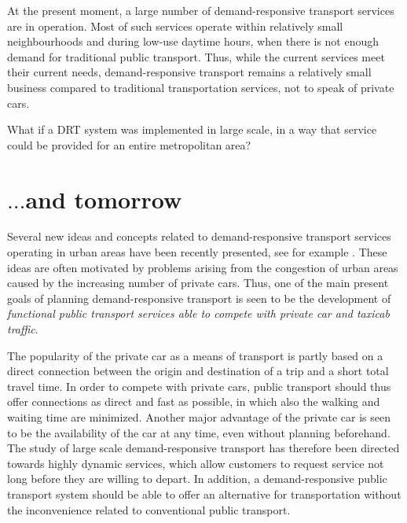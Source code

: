 \documentclass[dissertation,draft*]{aaltoseries}
\begin{document}
At the present moment, a large number of demand-responsive transport services are 
in operation. Most of such services operate within relatively small neighbourhoods and 
during low-use daytime hours, when there is not enough demand for traditional 
public transport. Thus, while the current services meet their current needs,
demand-responsive transport remains a relatively small business
compared to traditional transportation services, not to speak of private cars.

What if a DRT system was implemented in large scale, in a way that service could be provided
for an entire metropolitan area?

\section{$\ldots$and tomorrow}
Several new ideas and concepts related to demand-responsive transport
services operating in urban areas have been recently presented, see for example \cite{cortes,jokinen-fists-2011}.
These ideas are often motivated by problems arising from the congestion of urban 
areas caused by the increasing number of private cars.
Thus, one of the main present goals of planning demand-responsive transport is seen
to be the development of \emph{functional public transport services able to compete
with private car and taxicab traffic}.


The popularity of the private car as a means of transport is partly based on
a direct connection between the origin and destination of a trip and
a short total travel time. In order to compete with private cars, public transport 
should thus offer connections as direct and fast as possible, in which also
the walking and waiting time are minimized. 
Another major advantage of the private car is seen to be the availability
of the car at any time, even without planning beforehand. The study of large scale 
demand-responsive transport has therefore been directed towards highly dynamic services, which allow 
customers to request service not long before they are willing to depart.
In addition, a demand-responsive public transport system should be
able to offer an alternative for transportation without
the inconvenience related to conventional public transport.

\end{document}
